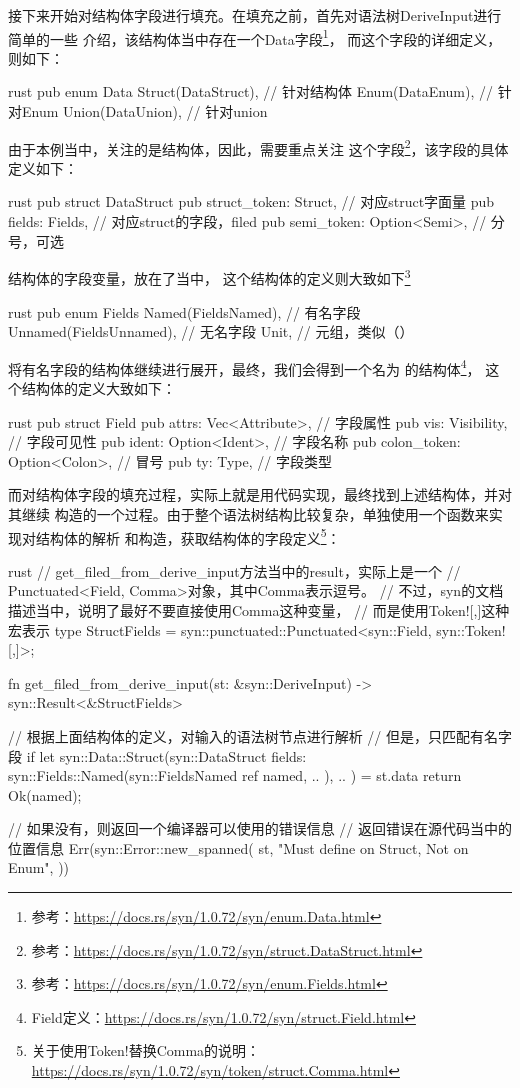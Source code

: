 接下来开始对结构体字段进行填充。在填充之前，首先对语法树DeriveInput进行简单的一些
介绍，该结构体当中存在一个Data字段\footnote{参考：\url{https://docs.rs/syn/1.0.72/syn/enum.Data.html}}，
而这个字段的详细定义，则如下：
\begin{code-block}{rust}
pub enum Data {
    Struct(DataStruct), // 针对结构体
    Enum(DataEnum),     // 针对Enum
    Union(DataUnion),   // 针对union
}
\end{code-block}
由于本例当中，关注的是结构体，因此，需要重点关注
这个字段\footnote{参考：\url{https://docs.rs/syn/1.0.72/syn/struct.DataStruct.html}}，该字段的具体定义如下：
\begin{code-block}{rust}
pub struct DataStruct {
    pub struct_token: Struct,       // 对应struct字面量
    pub fields: Fields,             // 对应struct的字段，filed
    pub semi_token: Option<Semi>,   // 分号，可选
}
\end{code-block}
结构体的字段变量，放在了当中，
这个结构体的定义则大致如下\footnote{参考：\url{https://docs.rs/syn/1.0.72/syn/enum.Fields.html}}
\begin{code-block}{rust}
pub enum Fields {
    Named(FieldsNamed),         // 有名字段
    Unnamed(FieldsUnnamed),     // 无名字段
    Unit,                       // 元组，类似（）
}
\end{code-block}
将有名字段的结构体继续进行展开，最终，我们会得到一个名为
的结构体\footnote{Field定义：\url{https://docs.rs/syn/1.0.72/syn/struct.Field.html}}，
这个结构体的定义大致如下：
\begin{code-block}{rust}
pub struct Field {
    pub attrs: Vec<Attribute>,          // 字段属性
    pub vis: Visibility,                // 字段可见性
    pub ident: Option<Ident>,           // 字段名称
    pub colon_token: Option<Colon>,     // 冒号
    pub ty: Type,                       // 字段类型
}
\end{code-block}
而对结构体字段的填充过程，实际上就是用代码实现，最终找到上述结构体，并对其继续
构造的一个过程。由于整个语法树结构比较复杂，单独使用一个函数来实现对结构体的解析
和构造，获取结构体的字段定义\footnote{关于使用Token!替换Comma的说明：\url{https://docs.rs/syn/1.0.72/syn/token/struct.Comma.html}}：
\begin{code-block}{rust}
// get_filed_from_derive_input方法当中的result，实际上是一个
// Punctuated<Field, Comma>对象，其中Comma表示逗号。
// 不过，syn的文档描述当中，说明了最好不要直接使用Comma这种变量，
// 而是使用Token![,]这种宏表示
type StructFields = syn::punctuated::Punctuated<syn::Field, syn::Token![,]>;

fn get_filed_from_derive_input(st: &syn::DeriveInput) -> syn::Result<&StructFields> {
    // 根据上面结构体的定义，对输入的语法树节点进行解析
    // 但是，只匹配有名字段
    if let syn::Data::Struct(syn::DataStruct {
        fields: syn::Fields::Named(syn::FieldsNamed { ref named, .. }),
        ..
    }) = st.data
    {
        return Ok(named);
    }

    // 如果没有，则返回一个编译器可以使用的错误信息
    // 返回错误在源代码当中的位置信息
    Err(syn::Error::new_spanned(
        st,
        "Must define on Struct, Not on Enum",
    ))
}
\end{code-block}

